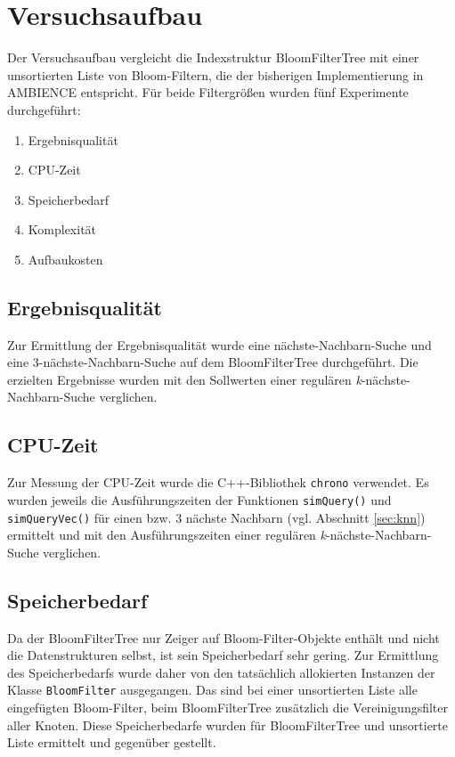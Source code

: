 \section{Versuchsaufbau}\label{sec:versuchsaufbau}
Der Versuchsaufbau vergleicht die Indexstruktur BloomFilterTree mit einer unsortierten Liste von Bloom-Filtern, die der bisherigen Implementierung in AMBIENCE entspricht. Für beide Filtergrößen wurden fünf Experimente durchgeführt:  
\begin{enumerate}
	\item Ergebnisqualität
	\item CPU-Zeit 
	\item Speicherbedarf 
	\item Komplexität 
	\item Aufbaukosten 
\end{enumerate}
\subsection{Ergebnisqualität}\label{sec:ergebnisqualität}
Zur Ermittlung der Ergebnisqualität wurde eine nächste-Nachbarn-Suche und eine 3-nächste-Nachbarn-Suche auf dem BloomFilterTree durchgeführt. Die erzielten Ergebnisse wurden mit den Sollwerten einer regulären \textit{k}-nächste-Nachbarn-Suche verglichen. 
\subsection{CPU-Zeit}\label{sec:cpu-zeit}
Zur Messung der CPU-Zeit wurde die C++-Bibliothek \texttt{chrono} verwendet. Es wurden jeweils die Ausführungszeiten der Funktionen \texttt{simQuery()} und \texttt{simQueryVec()} für einen bzw. 3 nächste Nachbarn (vgl. Abschnitt \ref{sec:knn}) ermittelt und mit den Ausführungszeiten einer regulären \textit{k}-nächste-Nachbarn-Suche verglichen. 
\subsection{Speicherbedarf}\label{sec:speicherbedarf}
Da der BloomFilterTree nur Zeiger auf Bloom-Filter-Objekte enthält und nicht die Datenstrukturen selbst, ist sein Speicherbedarf sehr gering. %
Zur Ermittlung des Speicherbedarfs wurde daher von den tatsächlich allokierten Instanzen der Klasse \texttt{BloomFilter} ausgegangen. Das sind bei einer unsortierten Liste alle eingefügten Bloom-Filter, beim BloomFilterTree zusätzlich die Vereinigungsfilter aller Knoten. Diese Speicherbedarfe wurden für BloomFilterTree und unsortierte Liste ermittelt und gegenüber gestellt. 
